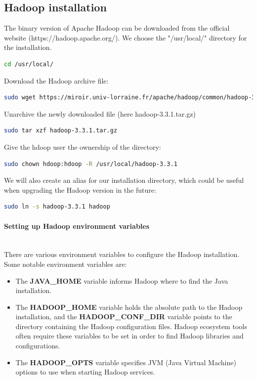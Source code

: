 \documentclass[12pt,english]{book}
\begin{document}
\subsection{Hadoop installation}


The binary version of Apache Hadoop can be downloaded from the official website (https://hadoop.apache.org/).
We choose the "/usr/local/" directory for the installation.
\begin{lstlisting}[language=bash, frame=single, basicstyle=\footnotesize]
cd /usr/local/
\end{lstlisting}
Download the Hadoop archive file:
\begin{lstlisting}[language=bash, frame=single, basicstyle=\footnotesize]
sudo wget https://miroir.univ-lorraine.fr/apache/hadoop/common/hadoop-3.3.1/hadoop-3.3.1.tar.gz
\end{lstlisting}
Unarchive the newly downloaded file (here hadoop-3.3.1.tar.gz)
\begin{lstlisting}[language=bash, frame=single, basicstyle=\footnotesize]
sudo tar xzf hadoop-3.3.1.tar.gz
\end{lstlisting}
Give the hdoop user the ownership of the directory:
\begin{lstlisting}[language=bash, frame=single, basicstyle=\footnotesize]
sudo chown hdoop:hdoop -R /usr/local/hadoop-3.3.1
\end{lstlisting}
We will also create an alias for our installation directory, which could be useful when upgrading the Hadoop version in the future:
\begin{lstlisting}[language=bash, frame=single, basicstyle=\footnotesize]
sudo ln -s hadoop-3.3.1 hadoop
\end{lstlisting}


\paragraph{Setting up Hadoop environment variables}\mbox{}\\


There are various environment variables to configure the Hadoop installation.
Some notable environment variables are:
\begin{itemize}
\item
The \textbf{JAVA\_HOME} variable informs Hadoop where to find the Java installation.

\item
The \textbf{HADOOP\_HOME} variable holds the absolute path to the Hadoop installation, and the \textbf{HADOOP\_CONF\_DIR} variable points to the directory containing the Hadoop configuration files.
Hadoop ecosystem tools often require these variables to be set in order to find Hadoop libraries and configurations.

\item
The \textbf{HADOOP\_OPTS}  variable specifies JVM (Java Virtual Machine) options to use when starting Hadoop services.

\end{itemize}
\end{document}

